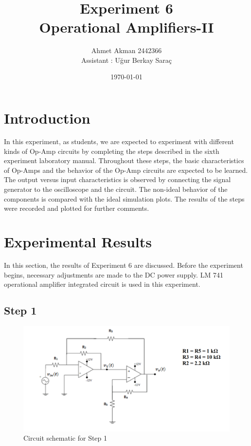 \documentclass[letterpaper,12pt]{article}
\begin{document}
\title{Experiment 6 \protect\\Operational Amplifiers-II}
\author{Ahmet Akman 2442366 \protect\\ Assistant : Uğur Berkay Saraç}
\date{\today}
\maketitle
\newpage
\tableofcontents
\newpage

\section{Introduction} 
In this experiment, as students, we are expected to experiment with different kinds of Op-Amp circuits by completing the steps described in the sixth experiment laboratory manual. Throughout these steps, the basic characteristics of Op-Amps and the behavior of the Op-Amp circuits are expected to be learned. The output versus input characteristics is observed by connecting the signal generator to the oscilloscope and the circuit. The non-ideal behavior of the components is compared with the ideal simulation plots. The results of the steps were recorded and plotted for further comments.
\section{Experimental Results}
In this section, the results of Experiment 6 are discussed. Before the experiment begins, necessary adjustments are made to the DC power supply. LM 741 operational amplifier integrated circuit is used in this experiment.
\subsection{Step 1}

\begin{figure}[H]
	\centering
   \includegraphics[width=1\textwidth]{circuit_1.png}
   \caption{Circuit schematic for Step 1}
\end{figure}
\end{document}
